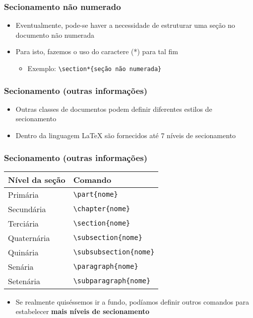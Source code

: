 \begin{frame}[fragile] \frametitle{Secionamento não numerado}
\begin{itemize}
	\item Eventualmente, pode-se haver a necessidade de estruturar uma seção no documento não numerada
	\item Para isto, fazemos o uso do caractere  (*) para tal fim
	\begin{itemize}
		\item Exemplo: \texttt{\textbackslash{}section*\{seção não numerada\}}
	\end{itemize}
\end{itemize}
\end{frame}

\begin{frame}[fragile] \frametitle{Secionamento (outras informações)}
\begin{itemize}
	\item Outras classes de documentos podem definir diferentes estilos de secionamento
	\item Dentro da linguagem LaTeX são fornecidos até 7 níveis de secionamento
\end{itemize}
\end{frame}

\begin{frame}[fragile] \frametitle{Secionamento (outras informações)}
\begin{table}[!t]
\centering
\begin{tabular}{l|l}
\hline
	\textbf{Nível da seção} & \textbf{Comando}									\\ \hline
	Primária				& \texttt{\textbackslash{}part\{nome\}}				\\ \hline
	Secundária				& \texttt{\textbackslash{}chapter\{nome\}}			\\ \hline
	Terciária				& \texttt{\textbackslash{}section\{nome\}}			\\ \hline
	Quaternária				& \texttt{\textbackslash{}subsection\{nome\}}		\\ \hline
	Quinária				& \texttt{\textbackslash{}subsubsection\{nome\}}	\\ \hline
	Senária					& \texttt{\textbackslash{}paragraph\{nome\}}		\\ \hline
	Setenária				& \texttt{\textbackslash{}subparagraph\{nome\}}		\\ \hline
\end{tabular}
\end{table}

\begin{itemize}
	\item Se realmente quiséssemos ir a fundo, podíamos definir outros comandos para estabelecer \textbf{mais níveis de secionamento}
\end{itemize}
\end{frame}

